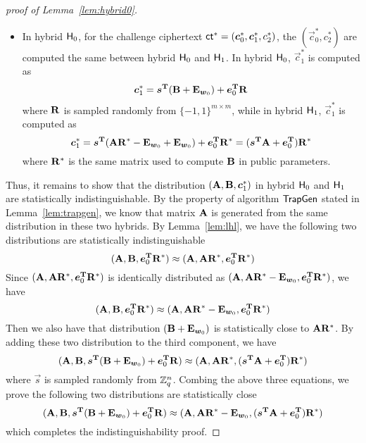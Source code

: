 \begin{proof}[proof of Lemma~\ref{lem:hybrid0}]
\begin{itemize}[leftmargin=*]
 \item In hybrid $\mathsf{H}_0$, for the challenge ciphertext $\mathsf{ct}^* = (\boldsymbol{c}_0^*, \boldsymbol{c}_1^*, c_2^*)$, the $(\vec{c}_0^*, c_2^*)$ are computed the same between hybrid $\mathsf{H}_0$ and $\mathsf{H}_1$. In hybrid $\mathsf{H}_0$, $\vec{c}_1^*$ is computed as
 $$\boldsymbol{c}_1^* = \boldsymbol{s}^{\mathbf{T}} (\mathbf{B} + \mathbf{E}_{\boldsymbol{w}_0}) + \boldsymbol{e}_0^{\mathbf{T}} \mathbf{R}$$
 where $\mathbf{R}$ is sampled randomly from $\{-1, 1\}^{m \times m }$, while in hybrid $\mathsf{H}_1$, $\vec{c}_1^*$ is computed as
 $$\boldsymbol{c}_1^* = \boldsymbol{s}^{\mathbf{T}} (\mathbf{A} \mathbf{R}^* - \mathbf{E}_{\boldsymbol{w}_0} + \mathbf{E}_{\boldsymbol{w}_0}) + \boldsymbol{e}^{\mathbf{T}}_0 \mathbf{R}^* = (\boldsymbol{s}^{\mathbf{T}} \mathbf{A} + \boldsymbol{e}_0^{\mathbf{T}}) \mathbf{R}^*$$
 where $\mathbf{R}^*$ is the same matrix used to compute $\mathbf{B}$ in public parameters.
\end{itemize}
Thus, it remains to show that the distribution $(\mathbf{A}, \mathbf{B}, \boldsymbol{c}_1^*)$ in hybrid $\mathsf{H}_0$ and $\mathsf{H}_1$ are statistically indistinguishable. By the property of algorithm $\mathsf{TrapGen}$ stated in Lemma~\ref{lem:trapgen}, we know that matrix $\mathbf{A}$ is generated from the same distribution in these two hybrids. By Lemma~\ref{lem:lhl}, we have the following two distributions are statistically indistinguishable
$$
(\mathbf{A}, \mathbf{B}, \boldsymbol{e}_0^{\mathbf{T}} \mathbf{R}^*) \approx (\mathbf{A}, \mathbf{A} \mathbf{R}^*, \boldsymbol{e}_0^{\mathbf{T}} \mathbf{R}^*)
$$
Since $(\mathbf{A}, \mathbf{A} \mathbf{R}^*, \boldsymbol{e}_0^{\mathbf{T}} \mathbf{R}^*)$ is identically distributed as $(\mathbf{A}, \mathbf{A} \mathbf{R}^* - \mathbf{E}_{\boldsymbol{w}_0}, \boldsymbol{e}_0^{\mathbf{T}} \mathbf{R}^*)$, we have
$$
(\mathbf{A}, \mathbf{B}, \boldsymbol{e}_0^{\mathbf{T}} \mathbf{R}^*) \approx (\mathbf{A}, \mathbf{A} \mathbf{R}^* - \mathbf{E}_{\boldsymbol{w}_0}, \boldsymbol{e}_0^{\mathbf{T}} \mathbf{R}^*)
$$
Then we also have that distribution $(\mathbf{B} + \mathbf{E}_{\boldsymbol{w}_0})$ is statistically close to $\mathbf{A} \mathbf{R}^*$. By adding these two distribution to the third component, we have
$$
(\mathbf{A}, \mathbf{B}, \boldsymbol{s}^{\mathbf{T}} (\mathbf{B} + \mathbf{E}_{\boldsymbol{w}_0}) + \boldsymbol{e}_0^{\mathbf{T}} \mathbf{R}) \approx (\mathbf{A}, \mathbf{A} \mathbf{R}^*, (\boldsymbol{s}^{\mathbf{T}} \mathbf{A} + \boldsymbol{e}_0^{\mathbf{T}}) \mathbf{R}^*)
$$
where $\vec{s}$ is sampled randomly from $\mathbb{Z}_q^n$. Combing the above three equations, we prove the following two distributions are statistically close
$$(\mathbf{A}, \mathbf{B}, \boldsymbol{s}^{\mathbf{T}} (\mathbf{B} + \mathbf{E}_{\boldsymbol{w}_0}) + \boldsymbol{e}_0^{\mathbf{T}} \mathbf{R}) \approx (\mathbf{A}, \mathbf{A} \mathbf{R}^* - \mathbf{E}_{\boldsymbol{w}_0}, (\boldsymbol{s}^{\mathbf{T}} \mathbf{A} + \boldsymbol{e}_0^{\mathbf{T}}) \mathbf{R}^* )$$ 
which completes the indistinguishability proof.
\end{proof}

